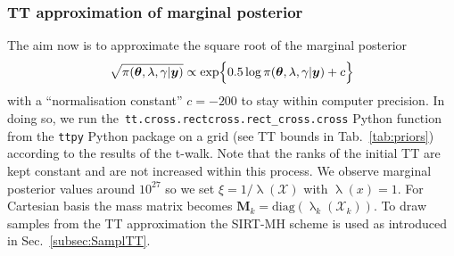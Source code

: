 \subsubsection{TT approximation of marginal posterior}
The aim now is to approximate the square root of the marginal posterior
\begin{align}
	\begin{split}
		\sqrt{\pi( \bm{\theta},\lambda,\gamma  | \bm{y})} \propto  \exp\Bigl\{ 0.5\log{\pi( \bm{\theta},\lambda,\gamma  | \bm{y}) } + c \Bigr\}  
	\end{split} 
	\label{eq:MargPostFullTT}
\end{align}
with a ``normalisation constant'' $c=-200$ to stay within computer precision.
In doing so, we run the~\texttt{tt.cross.rectcross.rect\_cross.cross} Python function from the \texttt{ttpy} Python package \cite{Oseledets2018ttpy} on a grid (see TT bounds in Tab.~\ref{tab:priors}) according to the results of the t-walk.
Note that the ranks of the initial TT are kept constant and are not increased within this process.
We observe marginal posterior values around $10^{27}$ so we set $\xi = 1 / \uplambda (\mathcal{X})$ with $\uplambda(x) = 1$.
For Cartesian basis the mass matrix becomes $\bm{M}_k = \text{diag}(\uplambda_k(\mathcal{X}_k))$.
To draw samples from the TT approximation the SIRT-MH scheme is used as introduced in Sec.~\ref{subsec:SamplTT}.

\cleardoublepage
